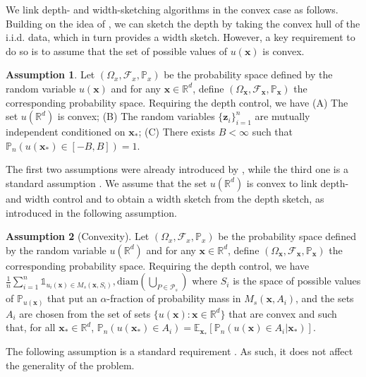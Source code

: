 \documentclass{article} %
\theoremstyle{remark}
\theoremstyle{definition}      %
\newtheorem{assumption}{Assumption}[section]  %
\begin{document}
We link depth- and width-sketching algorithms in the convex case as follows. Building on the idea of \cite{angelopoulos2024conformal}, we can sketch the depth by taking the convex hull of the i.i.d. data,
which in turn provides a width sketch. However, a key requirement to do so is to assume that the set of possible values of $u(\bm{x})$ is convex.
\begin{assumption}
  Let $(\Omega_x,\mathcal{F}_x,\mathbb{P}_x)$ be the probability space defined by the random variable $u(\bm{x})$ and  for any $\bm{x} \in \mathbb{R}^d$, define $(\Omega_{\bm{x}},\mathcal{F}_{\bm{x}},\mathbb{P}_{\bm{x}})$ the corresponding probability space. Requiring the depth control, we have (A)  \label{ass:convex} The set $u(\mathbb{R}^d)$ is convex; (B) \label{ass:iid} The random variables $\{ \bm{z}_i \}_{i=1}^n$  are mutually independent conditioned on $\bm{x}_*$; (C) \label{ass:bounded} There exists $B < \infty$ such that  $\mathbb{P}_n(u(\bm{x}_*) \in [-B,B]) =1$.
\end{assumption}
The first two assumptions were already introduced by \citet{angelopoulos2024conformal}, while the third one is a standard assumption \citep[e.g., see][]{lei2018distributionfree,bates2021distributionfree}.
We assume that the set $u(\mathbb{R}^d)$ is convex to link depth- and width control and to obtain a width sketch from the depth sketch, as introduced in the following assumption.
\begin{assumption}[Convexity] \label{ass:convex}
  Let $(\Omega_x,\mathcal{F}_x,\mathbb{P}_x)$ be the probability space defined by the random variable $u(\mathbb{R}^d)$ and  for any $\bm{x} \in \mathbb{R}^d$, define $(\Omega_{\bm{x}},\mathcal{F}_{\bm{x}},\mathbb{P}_{\bm{x}})$ the corresponding probability space. Requiring the depth control, we have \label{ass:convex1} $\frac{1}{n} \sum_{i=1}^n \mathds{1}_{u_i(\bm{x}) \in M_{s}(\bm{x},S_i)},\mathrm{diam}(\bigcup_{P \in  \mathcal{P}_s})$ where $S_i$ is the space of possible values of $\mathbb{P}_{u(\bm{x})}$ that put an $\alpha$-fraction of probability mass in $M_{s}(\bm{x},A_i)$, and the sets $A_i$ are chosen from the set of sets 
$\{u(\bm{x}) : \bm{x} \in \mathbb{R}^d\}$ that are convex and such that, for all $\bm{x}_*\in \mathbb{R}^d$, $\mathbb{P}_n(u(\bm{x}_*) \in A_i) = \mathbb{E}_{\bm{x}_*}[ \mathbb{P}_n(u(\bm{x}) \in A_i |\bm{x}_*)].$
\end{assumption}
The following assumption is a standard requirement \citep[e.g., see][]{lei2018distributionfree,bates2021distributionfree}.
As such, it does not affect the generality of the problem. 
\end{document}
